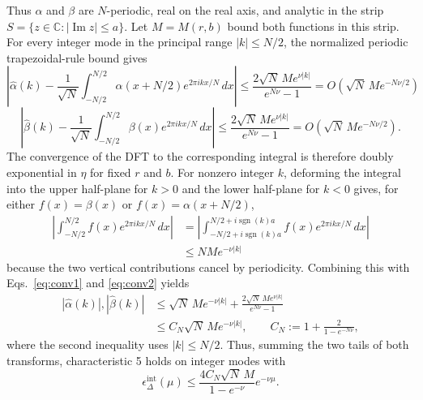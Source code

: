 \documentclass[aps,floatfix,10pt,amssymb,amsfont,amsmath,superscriptaddress,float,nofootinbib,longbibliography,nobalancelastpage,twocolumn]{revtex4-2}
\begin{document}
Thus $\alpha$ and $\beta$ are $N$-periodic, real on the real axis, and analytic in the strip $S=\{z\in\mathbb{C}:|\operatorname{Im}z|\leq a\}$. Let $M=M(r,b)$ bound both functions in this strip. For every integer mode in the principal range $|k|\leq N/2$, the normalized periodic trapezoidal-rule bound \cite{trefethen2014exponentially} gives
\begin{equation}
\label{eq:conv1}
    \left|\hat\alpha(k) - \frac{1}{\sqrt N}\int_{-N/2}^{N/2}\alpha(x+N/2)e^{2\pi i kx/N}\,dx\right|
    \leq \frac{2\sqrt N\,M e^{\nu|k|}}{e^{N\nu}-1}
    =O\!\left(\sqrt N\,M e^{-N\nu/2}\right)
\end{equation}
\begin{equation}
\label{eq:conv2}
    \left|\hat\beta(k) - \frac{1}{\sqrt N}\int_{-N/2}^{N/2}\beta(x)e^{2\pi i kx/N}\,dx\right|
    \leq \frac{2\sqrt N\,M e^{\nu|k|}}{e^{N\nu}-1}
    =O\!\left(\sqrt N\,M e^{-N\nu/2}\right).
\end{equation}
The convergence of the DFT to the corresponding integral is therefore doubly exponential in $\eta$ for fixed $r$ and $b$. For nonzero integer $k$, deforming the integral into the upper half-plane for $k>0$ and the lower half-plane for $k<0$ gives, for either $f(x)=\beta(x)$ or $f(x)=\alpha(x+N/2)$,
\begin{align}
    \left|\int_{-N/2}^{N/2}f(x)e^{2\pi i kx/N}\,dx\right|
    &=\left|\int_{-N/2+i\operatorname{sgn}(k)a}^{N/2+i\operatorname{sgn}(k)a}
      f(x)e^{2\pi i kx/N}\,dx\right|\\
    &\leq NM e^{-\nu|k|}
    \label{eq:tails}
\end{align}
because the two vertical contributions cancel by periodicity. Combining this with Eqs.~\eqref{eq:conv1} and \eqref{eq:conv2} yields
\begin{equation}
\label{eq:exactdecay}
\begin{split}
    |\hat \alpha(k)|,|\hat \beta(k)|
    &\leq \sqrt N\,M e^{-\nu|k|}
      +\frac{2\sqrt N\,M e^{\nu|k|}}{e^{N\nu}-1}\\
    &\leq C_N\sqrt N\,M e^{-\nu|k|},
    \qquad C_N:=1+\frac{2}{1-e^{-N\nu}},
\end{split}
\end{equation}
where the second inequality uses $|k|\leq N/2$. Thus, summing the two
tails of both transforms, characteristic 5 holds on integer modes with
\begin{equation}
    \epsilon_{\Delta}^{\mathrm{int}}(\mu)
    \leq\frac{4C_N\sqrt N\,M}{1-e^{-\nu}}e^{-\nu\mu}.
\end{equation}
\end{document}
